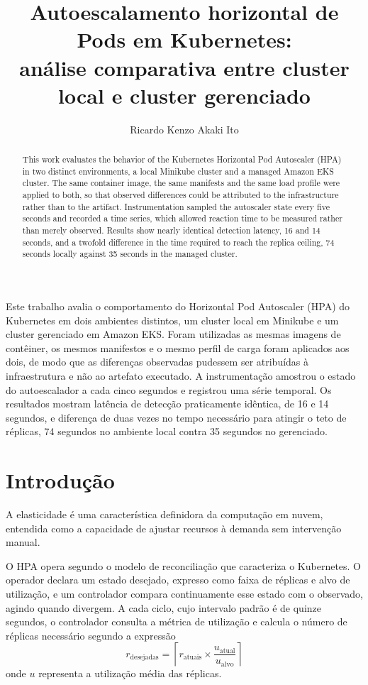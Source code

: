 \documentclass[12pt]{article}
\title{Autoescalamento horizontal de Pods em Kubernetes: \\
       análise comparativa entre cluster local e cluster gerenciado}
\author{Ricardo Kenzo Akaki Ito\inst{1}}
\begin{document}
\maketitle

\begin{abstract}
This work evaluates the behavior of the Kubernetes Horizontal Pod Autoscaler
(HPA) in two distinct environments, a local Minikube cluster and a managed
Amazon EKS cluster. The same container image, the same manifests and the same
load profile were applied to both, so that observed differences could be
attributed to the infrastructure rather than to the artifact. Instrumentation
sampled the autoscaler state every five seconds and recorded a time series,
which allowed reaction time to be measured rather than merely observed. Results
show nearly identical detection latency, 16 and 14 seconds, and a twofold
difference in the time required to reach the replica ceiling, 74 seconds
locally against 35 seconds in the managed cluster.
\end{abstract}

\begin{resumo}
Este trabalho avalia o comportamento do Horizontal Pod Autoscaler (HPA) do
Kubernetes em dois ambientes distintos, um cluster local em Minikube e um
cluster gerenciado em Amazon EKS. Foram utilizadas as mesmas imagens de contêiner, os mesmos
manifestos e o mesmo perfil de carga foram aplicados aos dois, de modo que as
diferenças observadas pudessem ser atribuídas à infraestrutura e não ao
artefato executado. A instrumentação amostrou o estado do autoescalador a cada
cinco segundos e registrou uma série temporal. Os resultados mostram latência de detecção
praticamente idêntica, de 16 e 14 segundos, e diferença de duas vezes no tempo
necessário para atingir o teto de réplicas, 74 segundos no ambiente local
contra 35 segundos no gerenciado.
\end{resumo}

\section{Introdução}

A elasticidade é uma característica definidora da
computação em nuvem, entendida como a capacidade de ajustar recursos à demanda
sem intervenção manual.

O HPA opera segundo o modelo de reconciliação que caracteriza o Kubernetes. O
operador declara um estado desejado, expresso como faixa de réplicas e alvo de
utilização, e um controlador compara continuamente esse estado com o observado,
agindo quando divergem. A cada ciclo, cujo intervalo padrão é de quinze
segundos, o controlador consulta a métrica de utilização e calcula o número de
réplicas necessário segundo a expressão
\[
r_{\text{desejadas}} = \left\lceil r_{\text{atuais}} \times
\frac{u_{\text{atual}}}{u_{\text{alvo}}} \right\rceil
\]
onde $u$ representa a utilização média das réplicas.
 
\end{document}

